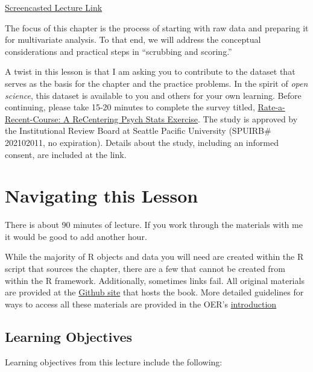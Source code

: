 \documentclass[
  11pt,
]{book}
\begin{document}
\href{https://spu.hosted.panopto.com/Panopto/Pages/Viewer.aspx?pid=7c87f991-276b-448f-aed9-acf6015b9638}{Screencasted Lecture Link}

The focus of this chapter is the process of starting with raw data and preparing it for multivariate analysis. To that end, we will address the conceptual considerations and practical steps in ``scrubbing and scoring.''

A twist in this lesson is that I am asking you to contribute to the dataset that serves as the basis for the chapter and the practice problems. In the spirit of \emph{open science}, this dataset is available to you and others for your own learning. Before continuing, please take 15-20 minutes to complete the survey titled, \href{https://spupsych.az1.qualtrics.com/jfe/form/SV_b2cClqAlLGQ6nLU}{Rate-a-Recent-Course: A ReCentering Psych Stats Exercise}. The study is approved by the Institutional Review Board at Seattle Pacific University (SPUIRB\# 202102011, no expiration). Details about the study, including an informed consent, are included at the link.

\hypertarget{navigating-this-lesson}{%
\section{Navigating this Lesson}\label{navigating-this-lesson}}

There is about 90 minutes of lecture. If you work through the materials with me it would be good to add another hour.

While the majority of R objects and data you will need are created within the R script that sources the chapter, there are a few that cannot be created from within the R framework. Additionally, sometimes links fail. All original materials are provided at the \href{https://github.com/lhbikos/ReC_MultivModel}{Github site} that hosts the book. More detailed guidelines for ways to access all these materials are provided in the OER's \protect\hyperlink{ReCintro}{introduction}

\hypertarget{learning-objectives}{%
\subsection{Learning Objectives}\label{learning-objectives}}

Learning objectives from this lecture include the following:
\end{document}
